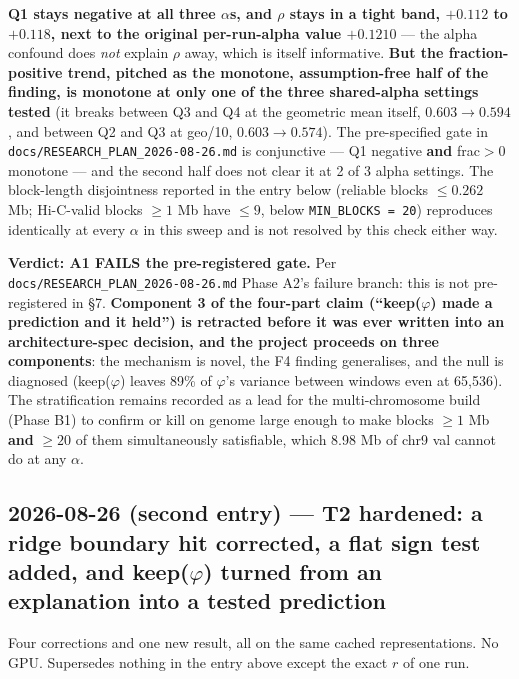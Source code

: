\documentclass[11pt,a4paper]{article}
\newcommand{\code}[1]{\texttt{\small #1}}
\begin{document}
\textbf{Q1 stays negative at all three $\alpha$s, and $\rho$ stays in a tight
band, $+0.112$ to $+0.118$, next to the original per-run-alpha value
$+0.1210$} --- the alpha confound does \emph{not} explain $\rho$ away, which is
itself informative. \textbf{But the fraction-positive trend, pitched as the
monotone, assumption-free half of the finding, is monotone at only one of the
three shared-alpha settings tested} (it breaks between Q3 and Q4 at the
geometric mean itself, $0.603 \to 0.594$, and between Q2 and Q3 at geo/10,
$0.603 \to 0.574$). The pre-specified gate in
\code{docs/RESEARCH\_PLAN\_2026-08-26.md} is conjunctive --- Q1 negative
\textbf{and} frac$>0$ monotone --- and the second half does not clear it at
2 of 3 alpha settings. The block-length disjointness reported in the entry
below (reliable blocks $\leq 0.262$ Mb; Hi-C-valid blocks $\geq 1$ Mb have
$\leq 9$, below \code{MIN\_BLOCKS = 20}) reproduces identically at every
$\alpha$ in this sweep and is not resolved by this check either way.

\textbf{Verdict: A1 FAILS the pre-registered gate.} Per
\code{docs/RESEARCH\_PLAN\_2026-08-26.md} Phase A2's failure branch: this is
not pre-registered in \S7. \textbf{Component 3 of the four-part claim
(``keep($\varphi$) made a prediction and it held'') is retracted before it was
ever written into an architecture-spec decision, and the project proceeds on
three components}: the mechanism is novel, the F4 finding generalises, and the
null is diagnosed (keep($\varphi$) leaves 89\% of $\varphi$'s variance between
windows even at 65,536).
The stratification remains recorded as a lead for the multi-chromosome build
(Phase B1) to confirm or kill on genome large enough to make blocks
$\geq 1$ Mb \textbf{and} $\geq 20$ of them simultaneously satisfiable, which
8.98 Mb of chr9 val cannot do at any $\alpha$.

\subsection*{2026-08-26 (second entry) --- T2 hardened: a ridge boundary hit
corrected, a flat sign test added, and keep($\varphi$) turned from an
explanation into a tested prediction}

Four corrections and one new result, all on the same cached representations.
No GPU. Supersedes nothing in the entry above except the exact $r$ of one run.
\end{document}
